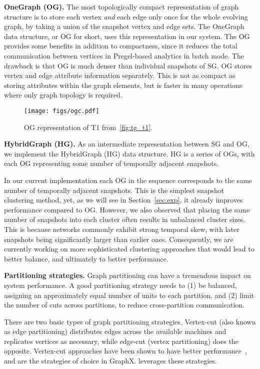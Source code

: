 {\bf OneGraph (OG).}  The most topologically compact representation of
graph structure is to store each vertex {\em and} each edge only once
for the whole evolving graph, by taking a union of the snapshot vertex
and edge sets.  The OneGraph data structure, or OG for short, uses
this representation in our system.
%
The OG provides some benefits in addition to compactness, since it
reduces the total communication between vertices in Pregel-based
analytics in batch mode.  The drawback is that OG is much denser than
individual snapshots of SG.  OG stores vertex and edge attribute
information separately.  This is not as compact as storing attributes
within the graph elements, but is faster in many operations where only
graph topology is required.

\begin{figure}[t!]
\texttt{[image: figs/ogc.pdf]}
\caption{OG representation of T1 from~\ref{fig:tg_t1}.}
\label{fig:ogc}
\end{figure}

{\bf HybridGraph (HG).} As an intermediate representation between SG
and OG, we implement the HybridGraph (HG) data structure.  HG is a
series of OGs, with each OG representing some number of temporally
adjacent snapshots.

In our current implementation each OG in the sequence corresponds to
the same number of temporally adjacent snapshots.  This is the
simplest snapshot clustering method, yet, as we will see in
Section~\ref{sec:exp}, it already improves performance
compared to OG.  However, we also observed that placing the same
number of snapshots into each cluster often results in unbalanced
cluster sizes.  This is because networks commonly exhibit strong
temporal skew, with later snapshots being significantly larger than
earlier ones.  Consequently, we are currently working on more
sophisticated clustering approaches that would lead to better balance,
and ultimately to better performance.

{\bf Partitioning strategies.}  Graph partitioning can have a
tremendous impact on system performance.  A good partitioning strategy
needs to (1) be balanced, assigning an approximately equal number of
units to each partition, and (2) limit the number of cuts across
partitions, to reduce cross-partition communication.

There are two basic types of graph partitioning strategies. Vertex-cut
(also known as edge partitioning) distributes edges across the
available machines and replicates vertices as necessary, while
edge-cut (vertex partitioning) does the opposite.  Vertex-cut
approaches have been shown to have better
performance~\cite{Gonzalez2012}, and are the strategies of choice in
GraphX.  \ql leverages these strategies.

